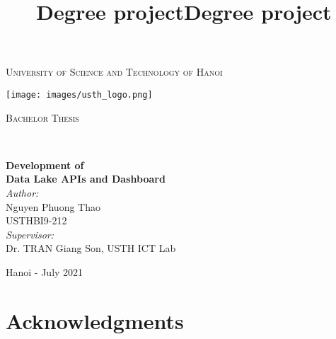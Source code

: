 \documentclass[12pt, twoside]{book}
\title{Degree project}
\title{Degree project}
\begin{document}
\linespread{1.25}

\thispagestyle{firststyle}
\begin{center}
  \textsc{\Large University of Science and Technology of Hanoi}
  \vspace*{-3cm}
  \begin{minipage}{0.48\textwidth} 
    \begin{center}
        \texttt{[image: images/usth\_logo.png]}
    \end{center}
  \end{minipage}
  \vspace*{1cm}

  \begin{minipage}{0.9\textwidth} 
    \begin{center}
      \textsc{\LARGE Bachelor Thesis}
    \end{center}
  \end{minipage}\\[0.5cm]
  
  \vspace*{1cm}

  { \huge \bfseries Development of \\ Data Lake APIs and Dashboard}\\[0.4cm]	

  \vspace*{0.5cm}
  { \large 
    \emph{Author:} \\	
      {Nguyen Phuong Thao} \\
      {USTHBI9-212} \\
    \vspace*{1.5cm}
    \emph{Supervisor:} \\													
      Dr. TRAN Giang Son, USTH ICT Lab \\
  }

  \begin{center}
    {Hanoi - July 2021}
  \end{center}
  
\end{center}
																		


\frontmatter

\chapter{Acknowledgments}
\label{chap:acknowledgments}

\end{document}

